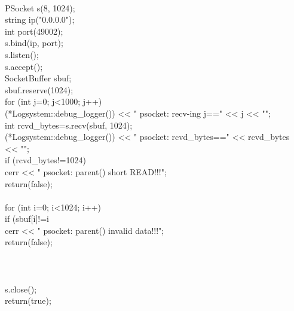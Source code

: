 \documentclass{article}
\begin{document}
 {
\\
     PSocket s(8, 1024);
\\
     string ip("0.0.0.0");
\\
     int port(49002);
\\
     s.bind(ip, port);
\\
     s.listen();
\\
     s.accept();
\\
     SocketBuffer sbuf;
\\
     sbuf.reserve(1024);
\\
         for (int j=0; j<1000; j++) {
\\
                 (*Logsystem::debug_logger()) << "    psocket: recv-ing j==" << j << "\n";
\\
         int rcvd_bytes=s.recv(sbuf, 1024);
\\
                 (*Logsystem::debug_logger()) << "    psocket: rcvd_bytes==" << rcvd_bytes 
\\
                                                                 << "\n";
\\
         if (rcvd_bytes!=1024) {
\\
                         cerr << "    psocket: parent() short READ!!!\n";
\\
                 return(false);
\\
                 }
\\
         for (int i=0; i<1024; i++) {
\\
                 if (sbuf[i]!=i%
\\
                                 cerr << "    psocket: parent() invalid data!!!\n";
\\
                 return(false);
\\
                         }
\\
         }
\\
         }
\\
     s.close();
\\
     return(true);
\\
\end{document}
